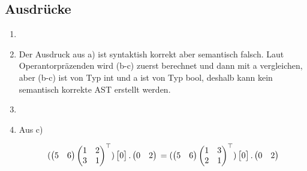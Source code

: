 \documentclass[twoside,colorbacktitle,accentcolor=tud2b]{tudexercise}
\begin{document}
  \subsection{Ausdrücke}
    \begin{enumerate}
   \item \leavevmode\vadjust{\vspace{-\baselineskip}}\newline
   \item 
   Der Ausdruck aus a) ist syntaktish korrekt aber semantisch falsch.
   Laut Operantorpräzenden wird (b-c) zuerst berechnet und dann mit a vergleichen,
   aber (b-c) ist von Typ int und a ist von Typ bool, deshalb kann kein semantisch korrekte AST erstellt werden.
  \item \leavevmode\vadjust{\vspace{-\baselineskip}}\newline
{}

\item Aus c) 

\[(\begin{pmatrix}
	5 & 6\\
\end{pmatrix}
\begin{pmatrix}
	1 & 2\\
	3 & 1\\
\end{pmatrix}^\top)
\begin{bmatrix}
0
\end{bmatrix}
.
\begin{pmatrix}
	0 & 2\\

\end{pmatrix}
\\
=(\begin{pmatrix}
5 & 6\\
\end{pmatrix}
\begin{pmatrix}
1 & 3\\
2 & 1\\
\end{pmatrix}^\top)
\begin{bmatrix}
0
\end{bmatrix}
.
\begin{pmatrix}
0 & 2\\


\end{pmatrix}\]
\end{enumerate}
\end{document}
